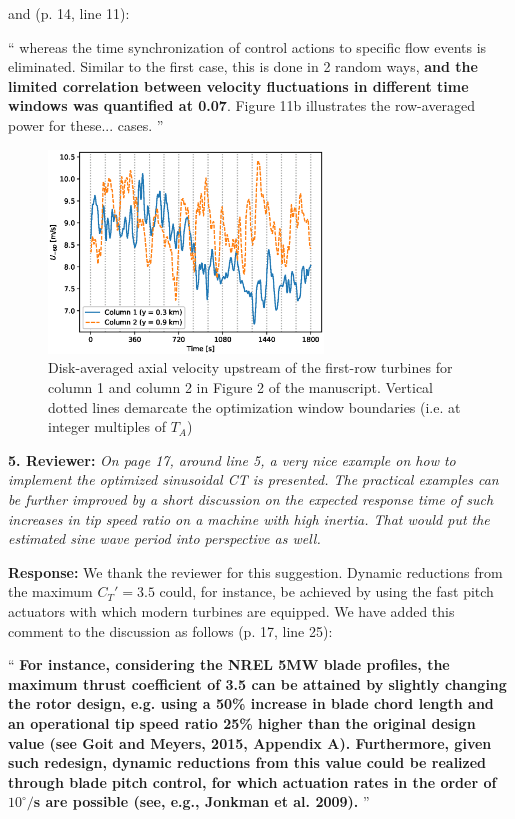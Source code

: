 \documentclass[]{article}
\begin{document}
and (p. 14, line 11):

``
whereas the time synchronization of control actions to specific flow events is eliminated. Similar to the first case, this is done in 2 random ways, \textbf{and the limited correlation between velocity fluctuations in different time windows was quantified at 0.07}. Figure 11b illustrates the row-averaged power for these...
cases.
''

\begin{figure}
	\centering
	\includegraphics[width=0.65\textwidth]{upstream_vel.eps}
	\caption{Disk-averaged axial velocity upstream of the first-row turbines for column 1 and column 2 in Figure 2 of the manuscript. Vertical dotted lines demarcate the optimization window boundaries (i.e. at integer multiples of $T_A$) \label{fig:upstream_vel}}
\end{figure}

\dotfill

\textbf{5. Reviewer: } \textit{On page 17, around line 5, a very nice example on how to implement the optimized
	sinusoidal CT is presented. The practical examples can be further improved by a
	short discussion on the expected response time of such increases in tip speed ratio
	on a machine with high inertia. That would put the estimated sine wave period into
	perspective as well.}

\textbf{Response: } We thank the reviewer for this suggestion. Dynamic reductions from the maximum $C_T' = 3.5$ could, for instance, be achieved by using the fast pitch actuators with which modern turbines are equipped. We have added this comment to the discussion as follows (p. 17, line 25):  

``
\textbf{For instance, considering the NREL 5MW blade profiles, the maximum thrust coefficient of 3.5 can be attained by slightly changing the rotor design, e.g. using a 50\% increase in blade chord length and an operational tip speed ratio 25\% higher than 
	the original design value (see Goit and Meyers, 2015, Appendix A). Furthermore, given such redesign, dynamic reductions from this value could be realized through blade pitch control, for which actuation rates in the order of $10^\circ/$s are possible (see, e.g., Jonkman et al. 2009).} 
''
 
\end{document}
